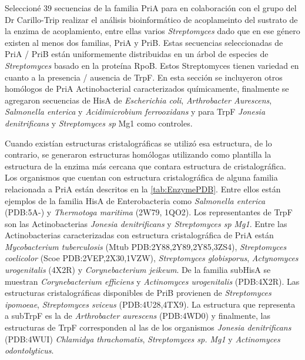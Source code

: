 \documentclass[12pt,twoside]{reedthesis}
\begin{document}
  Seleccioné 39 secuencias de la familia PriA para en colaboración con el
  grupo del Dr Carillo-Trip realizar el análisis bioinformático de
  acoplameinto del sustrato de la enzima de acoplamiento, entre ellas
  varios \emph{Streptomyces} dado que en ese género existen al menos dos
  familias, PriA y PriB. Estas secuencias seleccionadas de PriA / PriB
  están uniformemente distribuidas en un árbol de especies de
  \emph{Streptomyces} basado en la proteína RpoB. Estos Streptomyces
  tienen variedad en cuanto a la presencia / ausencia de TrpF. En esta
  sección se incluyeron otros homólogos de PriA Actinobacterial
  caracterizados químicamente, finalmente se agregaron secuencias de HisA
  de \emph{Escherichia coli}, \emph{Arthrobacter Aurescens},
  \emph{Salmonella enterica} y \emph{Acidimicrobium ferrooxidans} y para
  TrpF \emph{Jonesia denitrificans} y \emph{Streptomyces sp } Mg1 como
  controles.
  
  Cuando existían estructuras cristalográficas se utilizó esa estructura,
  de lo contrario, se generaron estructuras homólogas utilizando como
  plantilla la estructura de la enzima más cercana que contara estructura
  de cristalográfica. Los organismos que cuentan con estructura
  cristalográfica de alguna familia relacionada a PriA están descritos en
  la \autoref{tab:EnzymePDB}. Entre ellos están ejemplos de la familia
  HisA de Enterobacteria como \emph{Salmonella enterica} (PDB:5A-) y
  \emph{Thermotoga maritima} (2W79, 1QO2). Los representantes de TrpF son
  las Actinobacterias \emph{Jonesia denitrificans} y \emph{Streptomyces sp
  Mg1}. Entre las Actinobacterias caracterizadas con estructura
  cristalográfica de PriA están \emph{Mycobacterium tuberculosis} (Mtub
  PDB:2Y88,2Y89,2Y85,3ZS4), \emph{Streptomyces coelicolor} (Scoe
  PDB:2VEP,2X30,1VZW), \emph{Streptomyces globisporus}, \emph{Actynomyces
  urogenitalis} (4X2R) y \emph{Corynebacterium jeikeum}. De la familia
  subHisA se muestran \emph{Corynebacterium efficiens} y \emph{Actinomyces
  urogenitalis} (PDB:4X2R). Las estructuras cristalográficas disponibles
  de PriB provienen de \emph{Streptomyces ipomoeae}, \emph{Streptomyces
  sviceus} (PDB:4U28,4TX9). La estructura que representa a subTrpF es la
  de \emph{Arthrobacter aurescens} (PDB:4WD0) y finalmente, las
  estructuras de TrpF corresponden al las de los organismos \emph{Jonesia
  denitrificans} (PDB:4WUI) \emph{Chlamidya thrachomatis},
  \emph{Streptomyces sp. Mg1} y \emph{Actinomyces odontolyticus}.
  
  \clearpage  
  
\end{document}
